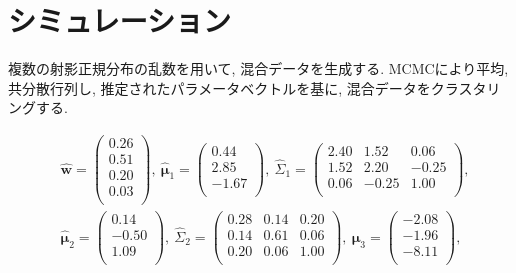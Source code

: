 \documentclass[a4j,12pt]{jarticle}
\begin{document}

\section{シミュレーション}

複数の射影正規分布の乱数を用いて, 混合データを生成する. MCMCにより平均, 共分散行列し, 推定されたパラメータベクトルを基に, 混合データをクラスタリングする. 

\begin{equation}
\label{sim_parameter}
\begin{split}
&\hat {\bm w} = \begin{pmatrix} 0.26 \\ 0.51 \\ 0.20 \\ 0.03 \\ \end{pmatrix},\ 
\hat{\bm \mu}_1 = \begin{pmatrix} 0.44 \\ 2.85 \\ -1.67 \\ \end{pmatrix},\ 
\hat \Sigma_1 = \begin{pmatrix}  2.40 & 1.52 &  0.06 \\ 1.52 & 2.20 & -0.25 \\ 0.06 & -0.25 &1.00 \\ \end{pmatrix},\\ 
&\hat{\bm \mu}_2 = \begin{pmatrix} 0.14 \\ -0.50 \\ 1.09 \\ \end{pmatrix},\ 
\hat \Sigma_2 = \begin{pmatrix}   0.28  & 0.14 &  0.20 \\ 0.14 & 0.61 & 0.06 \\  0.20 & 0.06 &1.00 \\ \end{pmatrix},\ 
\hat{\bm \mu}_3 = \begin{pmatrix} -2.08  \\ -1.96 \\ -8.11 \\ \end{pmatrix},\\ 

\end{split}
\end{equation}
\end{document}
